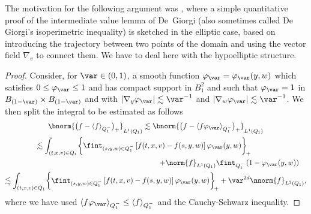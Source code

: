 \begin{remark}
The motivation for the following argument was \cite[Lem.\,10,
p.\,11]{vasseur}, where a simple quantitative proof of the
intermediate value lemma of De~Giorgi (also sometimes called De
Giorgi's isoperimetric inequality) is sketched in the elliptic
case, based on introducing the trajectory between two points of
the domain and using the vector field $\nabla_v$ to connect
them. We have to deal here with the hypoelliptic structure.
\end{remark}

\begin{proof}
Consider, for $\var \in (0,1)$, a smooth function
$\varphi_\var=\varphi_\var(y,w)$ which satisfies
$0\leq \varphi_\var \leq 1$ and has compact support in
$B_1^{2}$ and such that $\varphi_\var=1$ in
$B_{(1-\var)}\times B_{(1-\var)}$ and with
$|\nabla_y \varphi_\var|\lesssim \var^{-1}$ and
$|\nabla_w \varphi_\var|\lesssim \var^{-1}$. We then split the
integral to be estimated as follows
\begin{multline*}
\bnorm{\bigl(f-\langle f
\rangle_{Q_1^{-}}\bigr)_+}_{L^{1}(Q_1)} \lesssim
\bnorm{\bigl(f-\langle f \varphi_\var
\rangle_{Q_1^{-}} \bigr)_+}_{L^{1}(Q_1)}\\
\hspace*{-1.13cm}\lesssim
\int_{(t,x,v) \in Q_1}
\biggl\{ \fint_{(s,y,w) \in Q_1^-} \left[
f(t,x,v)-f(s,y,w) \right] \varphi_\var(y,
w) \biggr\}_{\!+} \\
\shoveright{+ \norm{f}_{L^1(Q_1)}
\fint_{Q_{1}^{-}}\left( 1 - \varphi_\var(y,w) \right)}\\
\lesssim \int_{(t,x,v) \in Q_1}
\biggl\{ \fint_{(s,y,w) \in Q_1^-} \left[
f(t,x,v)-f(s,y,w) \right] \varphi_\var(y,
w) \biggr\}_{\!+} + \var^{2d} \nnorm{f}_{L^2(Q_1)},
\end{multline*}
where we have used
$\langle f \varphi_\var \rangle_{Q_1^{-}}\leq \langle f
\rangle_{Q_1^{-}}$ and the Cauchy-Schwarz inequality.


\end{proof}
